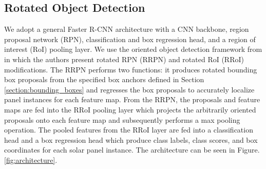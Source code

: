 \subsection{Rotated Object Detection}
We adopt a general Faster R-CNN architecture \citep{FasterRCNN} with a CNN backbone, region proposal network (RPN), classification and box regression head, and a region of interest (RoI) pooling layer. We use the oriented object detection framework from \citep{RRPN} in which the authors present rotated RPN (RRPN) and rotated RoI (RRoI) modifications. The RRPN performs two functions: it produces rotated bounding box proposals from the specified box anchors defined in Section \ref{section:bounding_boxes} and regresses the box proposals to accurately localize panel instances for each feature map. From the RRPN, the proposals and feature maps are fed into the RRoI pooling layer which projects the arbitrarily oriented proposals onto each feature map and subsequently performs a max pooling operation. The pooled features from the RRoI layer are fed into a classification head and a box regression head which produce class labels, class scores, and box coordinates 
for each solar panel instance. The architecture can be seen in Figure. \ref{fig:architecture}.